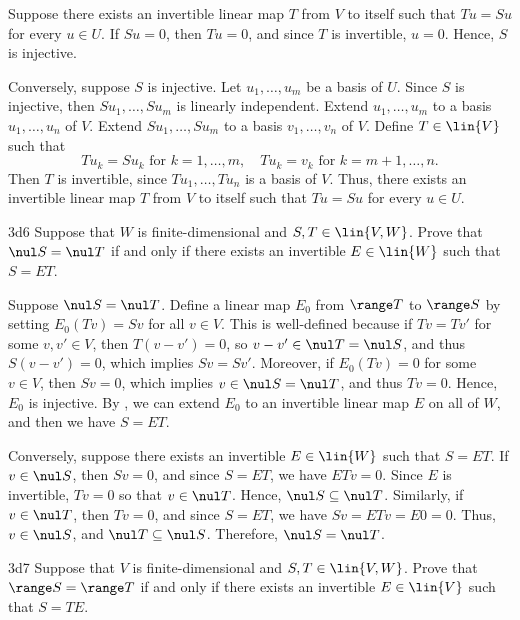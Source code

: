 \begin{sol}
    Suppose there exists an invertible linear map $T$ from $V$ to itself such that $Tu = Su$ for every $u \in U$.
	If $Su = 0$, then $Tu = 0$, and since $T$ is invertible, $u = 0$.
	Hence, $S$ is injective.

    Conversely, suppose $S$ is injective.
	Let $u_1, \ldots, u_m$ be a basis of $U$.
	Since $S$ is injective, then $Su_1, \ldots, Su_m$ is linearly independent.
	Extend $u_1, \ldots, u_m$ to a basis $u_1, \ldots, u_n$ of $V$.
	Extend $Su_1, \ldots, Su_m$ to a basis $v_1, \ldots, v_n$ of $V$.
	Define $T \in \lin{V}$ such that
    \[
    	Tu_k = Su_k \text{ for } k = 1, \ldots, m, \quad Tu_k = v_k \text{ for } k = m + 1, \ldots, n.
    \]
    Then $T$ is invertible, since $Tu_1, \ldots, Tu_n$ is a basis of $V$.
	Thus, there exists an invertible linear map $T$ from $V$ to itself such that $Tu = Su$ for every $u \in U$.
\end{sol}

\begin{exercise}{3d6}
    Suppose that $W$ is finite-dimensional and $S, T \in \lin{V, W}$.
	Prove that $\nul S = \nul T$ if and only if there exists an invertible $E \in \lin{W}$ such that $S = ET$.
\end{exercise}

\begin{sol}
    Suppose $\nul S = \nul T$.
	Define a linear map $E_0$ from $\range T$ to $\range S$ by setting $E_0(Tv) = Sv$ for all $v \in V$.
	This is well-defined because if $Tv = Tv'$ for some $v, v' \in V$, then $T(v - v') = 0$, so $v - v' \in \nul T = \nul S$, and thus $S(v - v') = 0$, which implies $Sv = Sv'$.
	Moreover, if $E_0(Tv) = 0$ for some $v \in V$, then $Sv = 0$, which implies $v \in \nul S = \nul T$, and thus $Tv = 0$.
	Hence, $E_0$ is injective.
	By , we can extend $E_0$ to an invertible linear map $E$ on all of $W$, and then we have $S = ET$.

    Conversely, suppose there exists an invertible $E \in \lin{W}$ such that $S = ET$.
	If $v \in \nul S$, then $Sv = 0$, and since $S = ET$, we have $ETv = 0$.
	Since $E$ is invertible, $Tv = 0$ so that $v \in \nul T$.
	Hence, $\nul S \subseteq \nul T$.
	Similarly, if $v \in \nul T$, then $Tv = 0$, and since $S = ET$, we have $Sv = ETv = E0 = 0$.
	Thus, $v \in \nul S$, and $\nul T \subseteq \nul S$.
	Therefore, $\nul S = \nul T$.
\end{sol}

\begin{exercise}{3d7}
    Suppose that $V$ is finite-dimensional and $S, T \in \lin{V, W}$.
	Prove that $\range S = \range T$ if and only if there exists an invertible $E \in \lin{V}$ such that $S = TE$.
\end{exercise}

